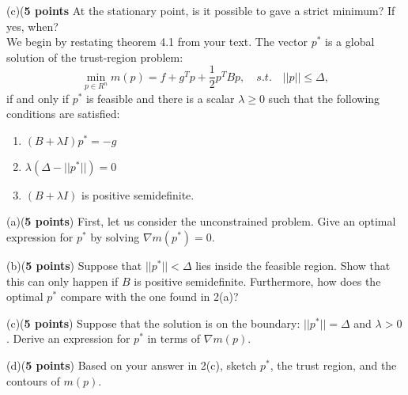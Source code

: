 \documentclass[12pt,legalpaper]{article}
\begin{document}
(c)({\bf 5 points} At the stationary point, is it possible to
 gave a strict minimum? If yes, when?
\newpage
%
%
\\
We begin by restating theorem 4.1 from your text.
The vector $p^*$ is a global solution of the trust-region problem:
$$ \min_{p\in R^n} m(p) = f+g^T p + \frac{1}{2} p^T B p, 
   \quad s.t. \quad ||p||\leq \Delta,$$
if and only if $p^*$ is feasible and there is a scalar $\lambda\geq 0$
such that the following conditions are satisfied:
\begin{enumerate}
\item $(B+\lambda I)p^* = -g$ 
\item $\lambda (\Delta - ||p^*||)=0$
\item $(B+\lambda I)$ \quad is positive semidefinite.
\end{enumerate}

(a)({\bf 5 points}) First, let us consider the unconstrained problem.
Give an optimal expression for $p^*$ by solving $\nabla m(p^*)=0$.
\vspace{1.0 true in}

(b)({\bf 5 points}) Suppose that $||p^*||<\Delta$ lies inside the feasible region. Show that this can only happen if $B$ is positive
semidefinite. Furthermore, how does the optimal $p^*$ compare with the 
one found in 2(a)?
\vspace{1.0 true in}

(c)({\bf 5 points}) Suppose that the solution is on the boundary:
$||p^*||=\Delta$ and $\lambda>0$. Derive an expression for $p^*$ in 
terms of $\nabla m(p)$.
\vspace{1.0 true in}


(d)({\bf 5 points}) Based on your answer in 2(c), sketch $p^*$, the trust region, and the contours of $m(p)$.
\newpage


\vspace{1.0 true in}





%
\end{document}
